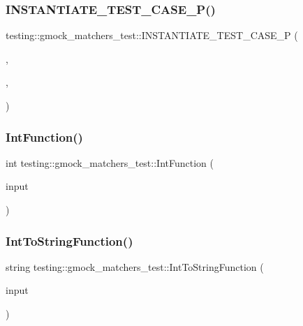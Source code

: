 \subsubsection{\texorpdfstring{I\+N\+S\+T\+A\+N\+T\+I\+A\+T\+E\+\_\+\+T\+E\+S\+T\+\_\+\+C\+A\+S\+E\+\_\+\+P()}{INSTANTIATE\_TEST\_CASE\_P()}\hspace{0.1cm}{\footnotesize\ttfamily [3/3]}}
{\footnotesize\ttfamily testing\+::gmock\+\_\+matchers\+\_\+test\+::\+I\+N\+S\+T\+A\+N\+T\+I\+A\+T\+E\+\_\+\+T\+E\+S\+T\+\_\+\+C\+A\+S\+E\+\_\+P (\begin{DoxyParamCaption}\item[{Samples}]{,  }\item[{\hyperlink{classtesting_1_1gmock__matchers__test_1_1_bipartite_random_test}{Bipartite\+Random\+Test}}]{,  }\item[{testing\+::\+Values(std\+::make\+\_\+pair(5, 10000), std\+::make\+\_\+pair(6, 5000), std\+::make\+\_\+pair(7, 2000), std\+::make\+\_\+pair(8, 500), std\+::make\+\_\+pair(9, 100))}]{ }\end{DoxyParamCaption})}

\mbox{\label{namespacetesting_1_1gmock__matchers__test_a6e957b9dcda1186c6274a8895d1514b5}} 
\subsubsection{\texorpdfstring{Int\+Function()}{IntFunction()}}
{\footnotesize\ttfamily int testing\+::gmock\+\_\+matchers\+\_\+test\+::\+Int\+Function (\begin{DoxyParamCaption}\item[{int}]{input }\end{DoxyParamCaption})}

\mbox{\label{namespacetesting_1_1gmock__matchers__test_a2399c4fae49f898c02f57a42047d80f2}} 
\subsubsection{\texorpdfstring{Int\+To\+String\+Function()}{IntToStringFunction()}}
{\footnotesize\ttfamily string testing\+::gmock\+\_\+matchers\+\_\+test\+::\+Int\+To\+String\+Function (\begin{DoxyParamCaption}\item[{int}]{input }\end{DoxyParamCaption})}

